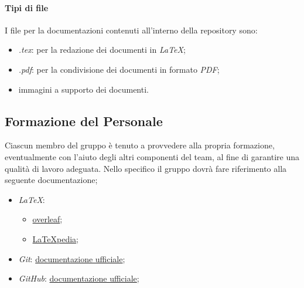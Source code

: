         \paragraph{Tipi di file}
        I file per la documentazioni contenuti all'interno della repository sono:
        \begin{itemize}
            \item \textit{.tex}: per la redazione dei documenti in \textit{LaTeX};
            \item \textit{.pdf}: per la condivisione dei documenti in formato \textit{PDF};
            \item immagini a supporto dei documenti.
        \end{itemize}

    \subsection{Formazione del Personale}
        Ciascun membro del gruppo è tenuto a provvedere alla propria formazione, eventualmente con l'aiuto degli altri componenti del team, al fine di garantire una qualità di lavoro adeguata.
        Nello specifico il gruppo dovrà fare riferimento alla seguente documentazione;
                \begin{itemize}
                    \item \textit{LaTeX}:
                        \begin{itemize}
                            \item  \href{https://www.overleaf.com/learn}{overleaf};
                            \item \href{http://www.lorenzopantieri.net/LaTeX_files/LaTeXpedia.pdf}{LaTeXpedia};
                        \end{itemize}
                    \item \textit{Git}: \href{https://git-scm.com/docs}{documentazione ufficiale};
                    \item \textit{GitHub}: \href{https://support.github.com}{documentazione ufficiale};
                \end{itemize}